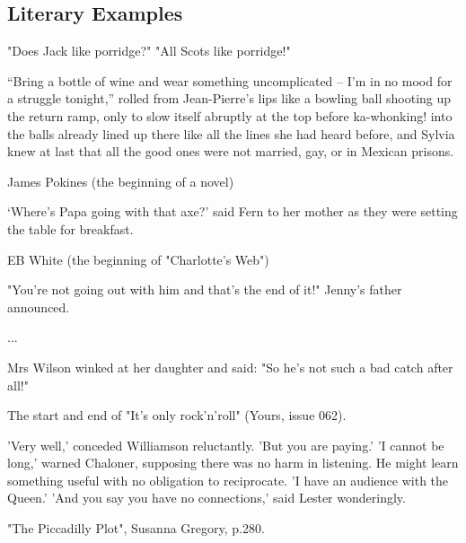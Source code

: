 \documentclass[11pt]{article}
\newenvironment{narrow}[2]{%
 \begin{list}{}{%
  \setlength{\topsep}{0pt}%
  \setlength{\leftmargin}{#1}%
  \setlength{\rightmargin}{#2}%
  \setlength{\listparindent}{\parindent}%
  \setlength{\itemindent}{\parindent}%
  \setlength{\parsep}{\parskip}%
 }%
\item[]}{\end{list}}
\begin{document}
\subsection*{Literary Examples}
\begin{itemize}
\item 
\begin{narrow}{1.0cm}{1.0cm} 
"Does Jack like porridge?" 
"All Scots like porridge!"
\end{narrow}


\item 
\begin{narrow}{1.0cm}{1.0cm}
 “Bring a bottle of wine and wear something uncomplicated – I’m in no mood for 
a struggle tonight,” rolled from Jean-Pierre’s lips like a bowling ball 
shooting up the return ramp, only to slow itself abruptly at the top before 
ka-whonking! into the balls already lined up there like all the lines she had 
heard before, and Sylvia knew at last that all the good ones were not married, 
gay, or in Mexican prisons.
\end{narrow}
James Pokines (the beginning of a novel)

\item 
\begin{narrow}{1.0cm}{1.0cm}
‘Where’s Papa going with that axe?’ said Fern to her mother as they were 
setting the table for breakfast.
\end{narrow}
EB White (the beginning of "Charlotte's Web") 



\item 
\begin{narrow}{1.0cm}{1.0cm}"You're not going out with him and that's the end of it!" Jenny's
father announced.

...

Mrs Wilson winked at her daughter and said: "So he's not such a bad catch
 after all!"
\end{narrow}
The start and end of "It's only rock'n'roll" (Yours, issue 062).

\item 
\begin{narrow}{1.0cm}{1.0cm}
'Very well,' conceded Williamson reluctantly. 'But you are paying.'
'I cannot be long,' warned Chaloner, supposing there was no harm in listening. 
He might learn something useful with no obligation to reciprocate. 'I have an 
audience with the Queen.'
'And you say you have no connections,' said Lester wonderingly.
\end{narrow}
"The Piccadilly Plot", Susanna Gregory, p.280.





\end{itemize}
\end{document}
